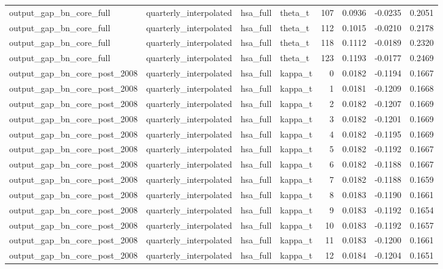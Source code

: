 \begin{tabular}{llllrrrr}
output\_gap\_bn\_core\_full & quarterly\_interpolated & hsa\_full & theta\_t & 107 & 0.0936 & -0.0235 & 0.2051 \\
output\_gap\_bn\_core\_full & quarterly\_interpolated & hsa\_full & theta\_t & 112 & 0.1015 & -0.0210 & 0.2178 \\
output\_gap\_bn\_core\_full & quarterly\_interpolated & hsa\_full & theta\_t & 118 & 0.1112 & -0.0189 & 0.2320 \\
output\_gap\_bn\_core\_full & quarterly\_interpolated & hsa\_full & theta\_t & 123 & 0.1193 & -0.0177 & 0.2469 \\
output\_gap\_bn\_core\_post\_2008 & quarterly\_interpolated & hsa\_full & kappa\_t & 0 & 0.0182 & -0.1194 & 0.1667 \\
output\_gap\_bn\_core\_post\_2008 & quarterly\_interpolated & hsa\_full & kappa\_t & 1 & 0.0181 & -0.1209 & 0.1668 \\
output\_gap\_bn\_core\_post\_2008 & quarterly\_interpolated & hsa\_full & kappa\_t & 2 & 0.0182 & -0.1207 & 0.1669 \\
output\_gap\_bn\_core\_post\_2008 & quarterly\_interpolated & hsa\_full & kappa\_t & 3 & 0.0182 & -0.1201 & 0.1669 \\
output\_gap\_bn\_core\_post\_2008 & quarterly\_interpolated & hsa\_full & kappa\_t & 4 & 0.0182 & -0.1195 & 0.1669 \\
output\_gap\_bn\_core\_post\_2008 & quarterly\_interpolated & hsa\_full & kappa\_t & 5 & 0.0182 & -0.1192 & 0.1667 \\
output\_gap\_bn\_core\_post\_2008 & quarterly\_interpolated & hsa\_full & kappa\_t & 6 & 0.0182 & -0.1188 & 0.1667 \\
output\_gap\_bn\_core\_post\_2008 & quarterly\_interpolated & hsa\_full & kappa\_t & 7 & 0.0182 & -0.1188 & 0.1659 \\
output\_gap\_bn\_core\_post\_2008 & quarterly\_interpolated & hsa\_full & kappa\_t & 8 & 0.0183 & -0.1190 & 0.1661 \\
output\_gap\_bn\_core\_post\_2008 & quarterly\_interpolated & hsa\_full & kappa\_t & 9 & 0.0183 & -0.1192 & 0.1654 \\
output\_gap\_bn\_core\_post\_2008 & quarterly\_interpolated & hsa\_full & kappa\_t & 10 & 0.0183 & -0.1192 & 0.1657 \\
output\_gap\_bn\_core\_post\_2008 & quarterly\_interpolated & hsa\_full & kappa\_t & 11 & 0.0183 & -0.1200 & 0.1661 \\
output\_gap\_bn\_core\_post\_2008 & quarterly\_interpolated & hsa\_full & kappa\_t & 12 & 0.0184 & -0.1204 & 0.1651 \\

\end{tabular}
